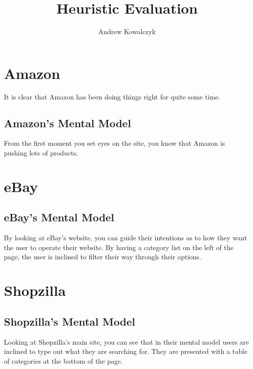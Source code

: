 \documentclass[11pt, oneside]{article}   	%
\title{Heuristic Evaluation}
\author{Andrew Kowalczyk}
\begin{document}
\maketitle

\section{Amazon}

It is clear that Amazon has been doing things right for quite some time.

\subsection{Amazon's Mental Model}

From the first moment you set eyes on the site, you know that Amazon is pushing lots of products.

\section{eBay}

\subsection{eBay's Mental Model}

By looking at eBay's website, you can guide their intentions as to how they want the user to operate their website. By having a category list on the left of the page, the user is inclined to filter their way through their options.

\section{Shopzilla}

\subsection{Shopzilla's Mental Model}

Looking at Shopzilla's main site, you can see that in their mental model users are inclined to type out what they are searching for. They are presented with a table of categories at the bottom of the page.
\end{document}
